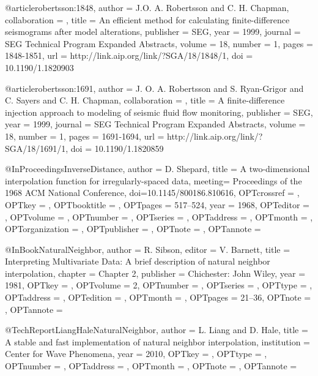 {@article{robertsson:1848,
author = {J.O. A. Robertsson and C. H. Chapman},
collaboration = {},
title = {An efficient method for calculating finite-difference seismograms after model alterations},
publisher = {SEG},
year = {1999},
journal = {SEG Technical Program Expanded Abstracts},
volume = {18},
number = {1},
pages = {1848-1851},
url = {http://link.aip.org/link/?SGA/18/1848/1},
doi = {10.1190/1.1820903}
}







@article{robertsson:1691,
author = {J. O. A. Robertsson and S.  Ryan-Grigor and C. Sayers and C. H. Chapman},
collaboration = {},
title = {A finite-difference injection approach to modeling of seismic fluid flow monitoring},
publisher = {SEG},
year = {1999},
journal = {SEG Technical Program Expanded Abstracts},
volume = {18},
number = {1},
pages = {1691-1694},
url = {http://link.aip.org/link/?SGA/18/1691/1},
doi = {10.1190/1.1820859}
}


@InProceedings{InverseDistance,
  author = 	 {D. Shepard},
  title = 	 {A two-dimensional interpolation function for
                  irregularly-spaced data},
  meeting= {Proceedings of the 1968 ACM National Conference},
  doi={10.1145/800186.810616},
  OPTcrossref =  {},
  OPTkey = 	 {},
  OPTbooktitle = {},
  OPTpages = 	 {517–524},
  year = 	 {1968},
  OPTeditor = 	 {},
  OPTvolume = 	 {},
  OPTnumber = 	 {},
  OPTseries = 	 {},
  OPTaddress = 	 {},
  OPTmonth = 	 {},
  OPTorganization = {},
  OPTpublisher = {},
  OPTnote = 	 {},
  OPTannote = 	 {}
}

@InBook{NaturalNeighbor,
  author = 	 {R. Sibson},
  editor = 	 {V. Barnett},
  title = 	 {Interpreting Multivariate Data: A brief description of natural neighbor interpolation},
  chapter = 	 {Chapter 2},
  publisher = 	 {Chichester: John Wiley},
  year = 	 {1981},
  OPTkey = 	 {},
  OPTvolume = 	 {2},
  OPTnumber = 	 {},
  OPTseries = 	 {},
  OPTtype = 	 {},
  OPTaddress = 	 {},
  OPTedition = 	 {},
  OPTmonth = 	 {},
  OPTpages = 	 {21–36},
  OPTnote = 	 {},
  OPTannote = 	 {}
}

@TechReport{LiangHaleNaturalNeighbor,
  author = 	 {L. Liang and D. Hale},
  title = 	 {A stable and fast implementation of natural neighbor
                  interpolation},
  institution =  {Center for Wave Phenomena},
  year = 	 {2010},
  OPTkey = 	 {},
  OPTtype = 	 {},
  OPTnumber = 	 {},
  OPTaddress = 	 {},
  OPTmonth = 	 {},
  OPTnote = 	 {},
  OPTannote = 	 {}
}


}
